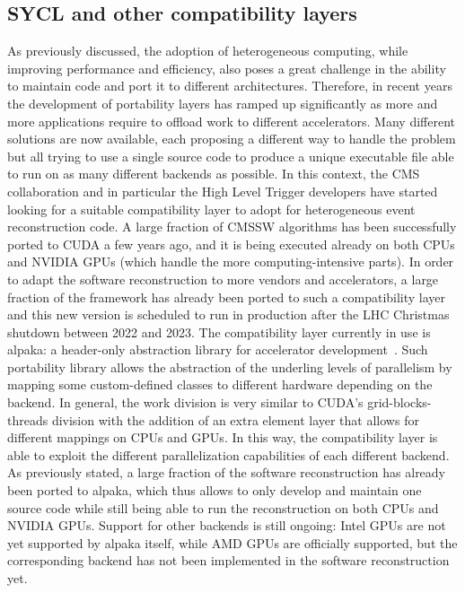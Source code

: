 \subsection{SYCL and other compatibility layers}
As previously discussed, the adoption of heterogeneous computing, while improving performance and efficiency, also poses a great challenge in the ability to maintain code and port it to different architectures. Therefore, in recent years the development of portability layers has ramped up significantly as more and more applications require to offload work to different accelerators. Many different solutions are now available, each proposing a different way to handle the problem but all trying to use a single source code to produce a unique executable file able to run on as many different backends as possible. In this context, the CMS collaboration and in particular the High Level Trigger developers have started looking for a suitable compatibility layer to adopt for heterogeneous event reconstruction code. A large fraction of CMSSW algorithms has been successfully ported to CUDA a few years ago, and it is being executed already on both CPUs and NVIDIA GPUs (which handle the more computing-intensive parts). In order to adapt the software reconstruction to more vendors and accelerators, a large fraction of the framework has already been ported to such a compatibility layer and this new version is scheduled to run in production after the LHC Christmas shutdown between 2022 and 2023. The compatibility layer currently in use is alpaka: a header-only abstraction library for accelerator development~\cite{alpaka}. Such portability library allows the abstraction of the underling levels of parallelism by mapping some custom-defined classes to different hardware depending on the backend. In general, the work division is very similar to CUDA's grid-blocks-threads division with the addition of an extra element layer that allows for different mappings on CPUs and GPUs. In this way, the compatibility layer is able to exploit the different parallelization capabilities of each different backend. As previously stated, a large fraction of the software reconstruction has already been ported to alpaka, which thus allows to only develop and maintain one source code while still being able to run the reconstruction on both CPUs and NVIDIA GPUs. Support for other backends is still ongoing: Intel GPUs are not yet supported by alpaka itself, while AMD GPUs are officially supported, but the corresponding backend has not been implemented in the software reconstruction yet.

